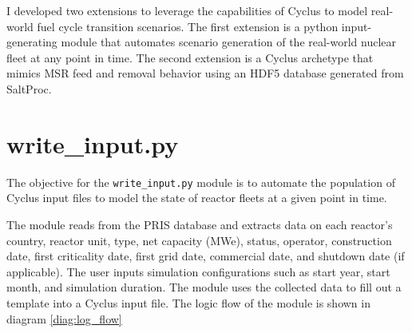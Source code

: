 I developed two extensions to leverage 
the capabilities of Cyclus to model
real-world fuel cycle transition scenarios.
The first extension is a python input-generating module
that automates scenario generation of the real-world 
nuclear fleet at any point in time. The second extension
is a Cyclus archetype that mimics \gls{MSR} feed and removal
behavior using an HDF5 database generated from SaltProc.

\section{write\_input.py}
\label{sec:writeinput}
The objective for the \texttt{write\_input.py} module
is to automate the population of Cyclus input files
to model the state of reactor fleets at a given
point in time. 

The module reads from the \gls{PRIS} database \cite{iaea_nuclear_2018}
and extracts data on each reactor's country, reactor unit,
type, net capacity (MWe), status, operator, construction date,
first criticality date, first grid date, commercial date,
and shutdown date (if applicable). The user inputs simulation
configurations such as start year, start month, and
simulation duration. The module uses the collected data to
fill out a template into a Cyclus input file. The logic flow of the module is 
shown in diagram \ref{diag:log_flow}


